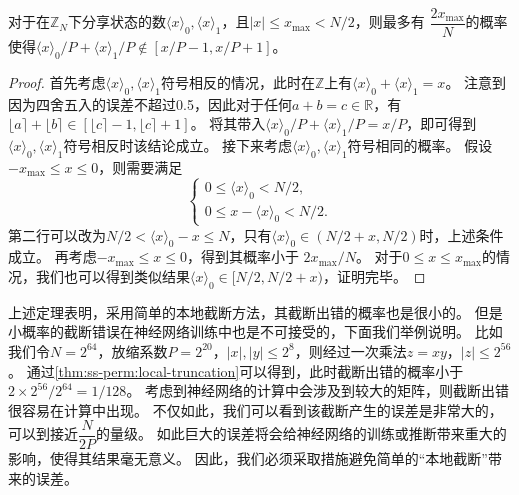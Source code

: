 \begin{theorem}[本地截断]
\label{thm:ss-perm:local-truncation}
    对于在$\mathbb Z_N$下分享状态的数$\langle x \rangle_0, \langle x \rangle_1$，且$|x| \le x_\text{max} < N/2$，则最多有
    $\dfrac{2x_\text{max}}{N}$的概率使得$\langle x \rangle_0/P + \langle x \rangle_1/P\notin [x/P - 1, x/P + 1]$。
\end{theorem}
\begin{proof}
    首先考虑$\langle x \rangle_0, \langle x \rangle_1$符号相反的情况，此时在$\mathbb Z$上有$\langle x \rangle_0 + \langle x \rangle_1 = x$。
    注意到因为四舍五入的误差不超过0.5，因此对于任何$a + b = c \in \mathbb R$，有$\lfloor a \rceil + \lfloor b \rceil \in [\lfloor c \rceil - 1, \lfloor c \rceil + 1]$。
    将其带入$\langle x \rangle_0/P + \langle x \rangle_1/P = x/P$，即可得到$\langle x \rangle_0, \langle x \rangle_1$符号相反时该结论成立。
    接下来考虑$\langle x \rangle_0, \langle x \rangle_1$符号相同的概率。
    假设$-x_\text{max} \le x \le 0$，则需要满足 
    \begin{equation}
    \begin{cases}
        0 \le \langle x \rangle_0 < N/2, \\
        0 \le x - \langle x \rangle_0 < N/2.
    \end{cases}
    \end{equation}
    第二行可以改为$N/2 < \langle x \rangle_0 - x \le N$，只有$\langle x \rangle_0 \in (N/2 + x, N/2)$时，上述条件成立。
    再考虑$-x_\text{max} \le x \le 0$，得到其概率小于 $2x_\text{max}/N$。
    对于$0 \le x \le x_\text{max}$的情况，我们也可以得到类似结果$\langle x \rangle_0 \in [N/2, N/2 + x)$，证明完毕。
\end{proof}
%
上述定理表明，采用简单的本地截断方法，其截断出错的概率也是很小的。
%
但是小概率的截断错误在神经网络训练中也是不可接受的，下面我们举例说明。
%
比如我们令$N = 2^{64}$，放缩系数$P = 2^{20}$，$|x|, |y| \le 2^{8}$，则经过一次乘法$z = xy$，$|z| \le 2^{56}$。
%
通过\autoref{thm:ss-perm:local-truncation}可以得到，此时截断出错的概率小于$2 \times 2^{56} / 2^{64} = 1/128$。
%
考虑到神经网络的计算中会涉及到较大的矩阵，则截断出错很容易在计算中出现。
%
不仅如此，我们可以看到该截断产生的误差是非常大的，可以到接近$\dfrac{N}{2P}$的量级。
%
如此巨大的误差将会给神经网络的训练或推断带来重大的影响，使得其结果毫无意义。
%
因此，我们必须采取措施避免简单的“本地截断”带来的误差。


